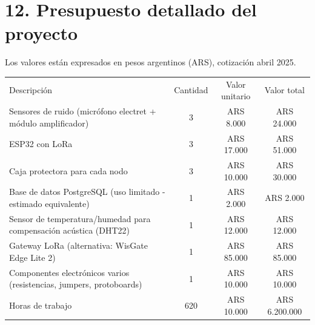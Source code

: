 \documentclass[
11pt, %
]{charter}
\begin{document}
\newpage

\section{12. Presupuesto detallado del proyecto}
\label{sec:presupuesto}
Los valores están expresados en pesos argentinos (ARS), cotización abril 2025.

\begin{table}[htpb]
\centering
\begin{tabularx}{\linewidth}{@{}|X|c|r|r|@{}}
\hline
\rowcolor[HTML]{C0C0C0} 
\multicolumn{4}{|c|}{\cellcolor[HTML]{C0C0C0}COSTOS DIRECTOS} \\ \hline
\rowcolor[HTML]{C0C0C0} 
Descripción &
  \multicolumn{1}{c|}{\cellcolor[HTML]{C0C0C0}Cantidad} &
  \multicolumn{1}{c|}{\cellcolor[HTML]{C0C0C0}Valor unitario} &
  \multicolumn{1}{c|}{\cellcolor[HTML]{C0C0C0}Valor total} \\ \hline
  Sensores de ruido (micrófono electret + módulo amplificador)&
  \multicolumn{1}{c|}{3} &
  \multicolumn{1}{c|}{ARS 8.000} &
  \multicolumn{1}{c|}{ARS 24.000} \\ \hline
 ESP32 con LoRa&
  \multicolumn{1}{c|}{3} &
  \multicolumn{1}{c|}{ARS 17.000} &
  \multicolumn{1}{c|}{ARS 51.000} \\ \hline
  Caja protectora para cada nodo&
  \multicolumn{1}{c|}{3} &
  \multicolumn{1}{c|}{ARS 10.000} &
  \multicolumn{1}{c|}{ARS 30.000} \\ \hline
  Base de datos PostgreSQL (uso limitado - estimado equivalente)&
  \multicolumn{1}{c|}{1} &
  \multicolumn{1}{c|}{ARS 2.000} &
  \multicolumn{1}{c|}{ARS 2.000} \\ \hline
  Sensor de temperatura/humedad para compensación acústica (DHT22)&
  \multicolumn{1}{c|}{1} &
  \multicolumn{1}{c|}{ARS 12.000} &
  \multicolumn{1}{c|}{ARS 12.000} \\ \hline
  Gateway LoRa (alternativa: WisGate Edge Lite 2)&
  \multicolumn{1}{c|}{1} &
  \multicolumn{1}{c|}{ARS 85.000} &
  \multicolumn{1}{c|}{ARS 85.000} \\ \hline
  Componentes electrónicos varios (resistencias, jumpers, protoboards)&
  \multicolumn{1}{c|}{1} &
  \multicolumn{1}{c|}{ARS 10.000} &
  \multicolumn{1}{c|}{ARS 10.000} \\ \hline
  Horas de trabajo&
  \multicolumn{1}{c|}{620} &
  \multicolumn{1}{c|}{ARS 10.000} &
  \multicolumn{1}{c|}{ARS 6.200.000} \\ \hline


\end{tabularx}
\end{table}
\end{document}
